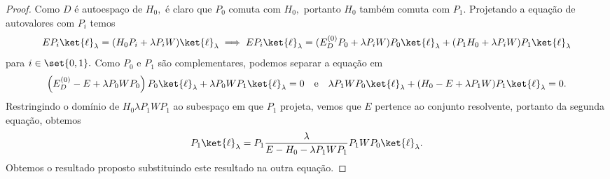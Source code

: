 \begin{proof}
    Como \(D\) é autoespaço de \(H_0,\) é claro que \(P_0\) comuta com \(H_0,\) portanto \(H_0\) também comuta com \(P_1.\) Projetando a equação de autovalores com \(P_i\) temos
    \begin{equation*}
        E P_i \ket{\ell}_\lambda = (H_0 P_i + \lambda P_i W)\ket{\ell}_\lambda \implies E P_i \ket{\ell}_\lambda = (E_D^{(0)} P_0 + \lambda P_i W)P_0\ket{\ell}_\lambda + (P_1H_0 + \lambda P_i W) P_1 \ket{\ell}_\lambda
    \end{equation*}
    para \(i \in \set{0,1}.\) Como \(P_0\) e \(P_1\) são complementares, podemos separar a equação em
    \begin{equation*}
        \left(E_D^{(0)} - E+ \lambda P_0 W P_0\right) P_0 \ket{\ell}_\lambda + \lambda P_0 W P_1 \ket{\ell}_\lambda = 0
        \quad\text{e}\quad
        \lambda P_1 W P_0 \ket{\ell}_{\lambda} + (H_0 - E + \lambda P_1 W) P_1 \ket{\ell}_\lambda = 0.
    \end{equation*}
    Restringindo o domínio de \(H_0 \lambda P_1 W P_1\) ao subespaço em que \(P_1\) projeta, vemos que \(E\) pertence ao conjunto resolvente, portanto da segunda equação, obtemos
    \begin{equation*}
        P_1 \ket{\ell}_{\lambda} = P_1 \frac{\lambda}{E - H_0 - \lambda P_1 W P_1} P_1WP_0\ket{\ell}_\lambda.
    \end{equation*}
    Obtemos o resultado proposto substituindo este resultado na outra equação.
\end{proof}
